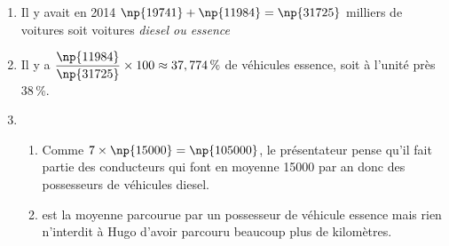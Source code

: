 \begin{enumerate}
\item %
Il y avait en 2014 $\np{19741} + \np{11984} = \np{31725}$ milliers de voitures soit  voitures \og \emph{diesel ou essence}\fg{}
\item %

Il y a $\dfrac{\np{11984}}{\np{31725}} \times 100 \approx 37,774\,\%$ de véhicules essence, soit à l'unité près 38\,\%.
\item  %



%

\medskip


	\begin{enumerate}
		\item %
Comme $7 \times \np{15000} = \np{105000}$, le présentateur pense qu'il fait partie des conducteurs qui font en moyenne 15000 par an donc des possesseurs de véhicules diesel.
		\item %
		 est la moyenne parcourue par un possesseur de véhicule essence mais rien n'interdit à Hugo d'avoir parcouru beaucoup plus de kilomètres.
	\end{enumerate}
 \end{enumerate}

\bigskip

